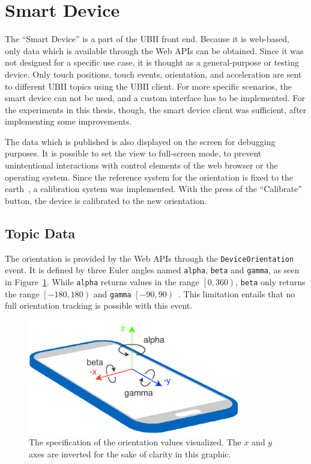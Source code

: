 \section{Smart Device}\label{section:smart-device}

The \enquote{Smart Device} is a part of the \ac{UBII} front end. Because it is web-based, only data which is available through the Web \acp{API} can be obtained. Since it was not designed for a specific use case, it is thought as a general-purpose or testing device. Only touch positions, touch events, orientation, and acceleration are sent to different \ac{UBII} topics using the \ac{UBII} client. For more specific scenarios, the smart device can not be used, and a custom interface has to be implemented. For the experiments in this thesis, though, the smart device client was sufficient, after implementing some improvements.

The data which is published is also displayed on the screen for debugging purposes. It is possible to set the view to full-screen mode, to prevent unintentional interactions with control elements of the web browser or the operating system. Since the reference system for the orientation is fixed to the earth~\cite[Chapter~4.1]{DevicesandSensorsWorkingGroup.2019}, a calibration system was implemented. With the press of the \enquote{Calibrate} button, the device is calibrated to the new orientation.


\subsection{Topic Data}\label{subsection:topic-data}

The orientation is provided by the Web \acp{API} through the \lstinline{DeviceOrientation} event. It is defined by three Euler angles named \lstinline{alpha}, \lstinline{beta} and \lstinline{gamma}, as seen in Figure~\ref{fig:webapi-device-orientation}.
While \lstinline{alpha} returns values in the range \(\left[0, 360\right)\), \lstinline{beta} only returns the range \(\left[-180, 180\right)\) and \lstinline{gamma} \(\left[-90, 90\right)\)~\cite[Chapter~4.1]{DevicesandSensorsWorkingGroup.2019}. %
This limitation entails that no full orientation tracking is possible with this event. 

\begin{figure}[htpb]
  \centering
  \includegraphics[height=5cm]{figures/implementation/webapi_device_orientation.pdf}
  \caption[Device coordinate system and orientation values]{The specification of the orientation values visualized. The \(x\) and \(y\) axes are inverted for the sake of clarity in this graphic.}\label{fig:webapi-device-orientation}
\end{figure}

